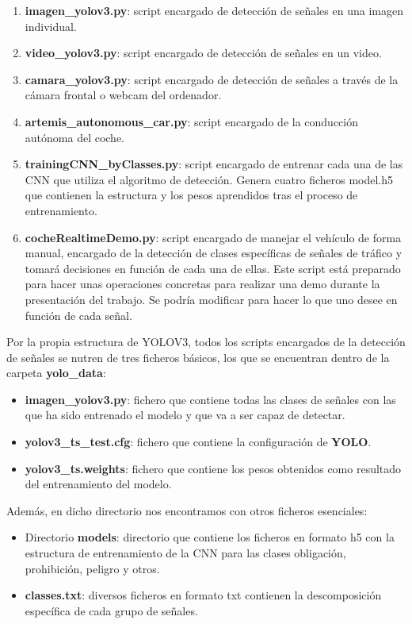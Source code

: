 \begin{enumerate}
\item \textbf{imagen_yolov3.py}: script encargado de detección de señales en una imagen individual.
\item \textbf{video_yolov3.py}: script encargado de detección de señales en un video.
\item \textbf{camara_yolov3.py}: script encargado de detección de señales a través de la cámara frontal o webcam del ordenador.
\item \textbf{artemis_autonomous_car.py}: script encargado de la conducción autónoma del coche.
\item \textbf{trainingCNN_byClasses.py}: script encargado de entrenar cada una de las CNN que utiliza el algoritmo de detección. Genera cuatro ficheros model.h5 que contienen la estructura y los pesos aprendidos tras el proceso de entrenamiento.
\item \textbf{cocheRealtimeDemo.py}: script encargado de manejar el vehículo de forma manual, encargado de la detección de clases específicas de señales de tráfico y tomará decisiones en función de cada una de ellas. Este script está preparado para hacer unas operaciones concretas para realizar una demo durante la presentación del trabajo. Se podría modificar para hacer lo que uno desee en función de cada señal.
\end{enumerate}

Por la propia estructura de YOLOV3, todos los scripts encargados de la detección de señales se nutren de tres ficheros básicos, los que se encuentran dentro de la carpeta \textbf{yolo_data}:
\begin{itemize}
\item \textbf{imagen_yolov3.py}: fichero que contiene todas las clases de señales con las que ha sido entrenado el modelo y que va a ser capaz de detectar.
\item \textbf{yolov3_ts_test.cfg}: fichero que contiene la configuración de \textbf{YOLO}.
\item \textbf{yolov3_ts.weights}: fichero que contiene los pesos obtenidos como resultado del entrenamiento del modelo.\\
\end{itemize}

Además, en dicho directorio nos encontramos con otros ficheros esenciales:

\begin{itemize}
\item Directorio \textbf{models}: directorio que contiene los ficheros en formato h5 con la estructura de entrenamiento de la CNN para las clases obligación, prohibición, peligro y otros.
\item \textbf{classes.txt}: diversos ficheros en formato txt contienen la descomposición específica de cada grupo de señales.
\end{itemize}

